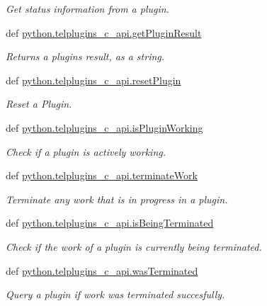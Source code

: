 \begin{DoxyCompactItemize}
\begin{DoxyCompactList}\small\item\em Get status information from a plugin. \end{DoxyCompactList}\item 
def \hyperlink{group__plugins_gadb3d3fd9d80a70e11e8b076b75a5c96a}{python.\-telplugins\-\_\-c\-\_\-api.\-get\-Plugin\-Result}
\begin{DoxyCompactList}\small\item\em Returns a plugins result, as a string. \end{DoxyCompactList}\item 
def \hyperlink{group__plugins_ga284e82f870ebf6d10d6b0c619d9ff2fc}{python.\-telplugins\-\_\-c\-\_\-api.\-reset\-Plugin}
\begin{DoxyCompactList}\small\item\em Reset a Plugin. \end{DoxyCompactList}\item 
def \hyperlink{group__plugins_gafbc49170f2ed10069c43f5d4c9dfb9f8}{python.\-telplugins\-\_\-c\-\_\-api.\-is\-Plugin\-Working}
\begin{DoxyCompactList}\small\item\em Check if a plugin is actively working. \end{DoxyCompactList}\item 
def \hyperlink{group__plugins_ga9ff00098759b9787daded977f7e6e989}{python.\-telplugins\-\_\-c\-\_\-api.\-terminate\-Work}
\begin{DoxyCompactList}\small\item\em Terminate any work that is in progress in a plugin. \end{DoxyCompactList}\item 
def \hyperlink{group__plugins_ga150f1be5ee4e3684370bc891ec77c5db}{python.\-telplugins\-\_\-c\-\_\-api.\-is\-Being\-Terminated}
\begin{DoxyCompactList}\small\item\em Check if the work of a plugin is currently being terminated. \end{DoxyCompactList}\item 
def \hyperlink{group__plugins_gaa630bfdee489843279262216745ea7fb}{python.\-telplugins\-\_\-c\-\_\-api.\-was\-Terminated}
\begin{DoxyCompactList}\small\item\em Query a plugin if work was terminated succesfully. \end{DoxyCompactList}\item 

\end{DoxyCompactItemize}
